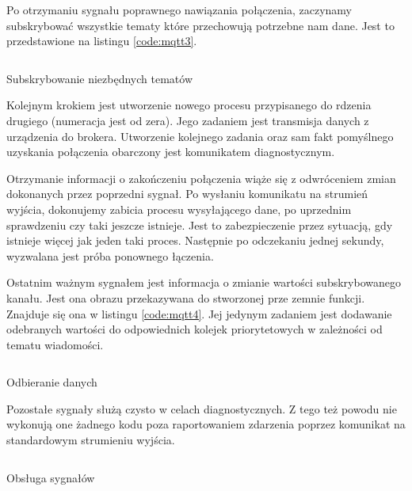         Po otrzymaniu sygnału poprawnego nawiązania połączenia, zaczynamy subskrybować wszystkie tematy które przechowują potrzebne nam dane. Jest to przedstawione na listingu \ref{code:mqtt3}.
          
        \begin{kod}
            \inputminted[firstline=14, lastline=19]{cpp}{esp/listings/mqtt.cpp}
            \caption{Subskrybowanie niezbędnych tematów}
            \label{code:mqtt3}
            \vspace{1em}
        \end{kod}
        
        
        
        Kolejnym krokiem jest utworzenie nowego procesu przypisanego do rdzenia drugiego (numeracja jest od zera). Jego zadaniem jest transmisja danych z urządzenia do brokera. Utworzenie kolejnego zadania oraz sam fakt pomyślnego uzyskania połączenia obarczony jest komunikatem diagnostycznym.
        
        Otrzymanie informacji o zakończeniu połączenia wiąże się z odwróceniem zmian dokonanych przez poprzedni sygnał. Po wysłaniu komunikatu na strumień wyjścia, dokonujemy zabicia procesu wysyłającego dane, po uprzednim sprawdzeniu czy taki jeszcze istnieje. Jest to zabezpieczenie przez sytuacją, gdy istnieje więcej jak jeden taki proces. Następnie po odczekaniu jednej sekundy, wyzwalana jest próba ponownego łączenia. 
        
        Ostatnim ważnym sygnałem jest informacja o zmianie wartości subskrybowanego kanału. Jest ona obrazu  przekazywana do stworzonej prze zemnie funkcji. Znajduje się ona w listingu \ref{code:mqtt4}. Jej jedynym zadaniem jest dodawanie odebranych wartości do odpowiednich kolejek priorytetowych w zależności od tematu wiadomości. 
     
        \begin{kod}
            \inputminted[firstline=21, lastline=44]{cpp}{esp/listings/mqtt.cpp}
            \caption{Odbieranie danych}
            \label{code:mqtt4}
            \vspace{1em}
        \end{kod}
        
           
           
        Pozostałe sygnały służą czysto w celach diagnostycznych. Z tego też powodu nie wykonują one żadnego kodu poza raportowaniem zdarzenia poprzez komunikat na standardowym strumieniu wyjścia.  
        
        \begin{kod}
            \inputminted[firstline=73, lastline=125]{cpp}{esp/listings/mqtt.cpp}
            \caption{Obsługa sygnałów}
            \label{code:mqtt5}
            \vspace{2em}
        \end{kod}
        
